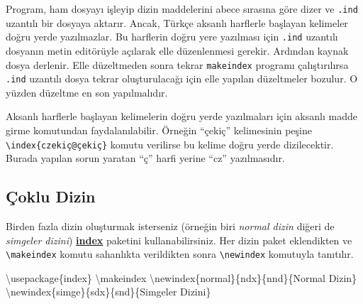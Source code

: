 \documentclass[
  letterpaper,
  DIV=11,
  numbers=noendperiod]{scrreprt}
\newenvironment{Shaded}{\begin{snugshade}}{\end{snugshade}}
\newcommand{\BuiltInTok}[1]{\textcolor[rgb]{0.00,0.23,0.31}{#1}}
\newcommand{\ExtensionTok}[1]{\textcolor[rgb]{0.00,0.23,0.31}{#1}}
\newcommand{\FunctionTok}[1]{\textcolor[rgb]{0.28,0.35,0.67}{#1}}
\newcommand{\NormalTok}[1]{\textcolor[rgb]{0.00,0.23,0.31}{#1}}
\begin{document}
Program, ham dosyayı işleyip dizin maddelerini abece sırasına göre dizer
ve \texttt{.ind} uzantılı bir dosyaya aktarır. Ancak, Türkçe aksanlı
harflerle başlayan kelimeler doğru yerde yazılmazlar. Bu harflerin doğru
yere yazılması için \texttt{.ind} uzantılı dosyanın metin editörüyle
açılarak elle düzenlenmesi gerekir. Ardından kaynak dosya derlenir. Elle
düzeltmeden sonra tekrar \texttt{makeindex} programı çalıştırılırsa
\texttt{.ind} uzantılı dosya tekrar oluşturulacağı için elle yapılan
düzeltmeler bozulur. O yüzden düzeltme en son yapılmalıdır.

\begin{tcolorbox}[enhanced jigsaw, opacitybacktitle=0.6, coltitle=black, leftrule=.75mm, rightrule=.15mm, toprule=.15mm, bottomtitle=1mm, titlerule=0mm, colbacktitle=quarto-callout-note-color!10!white, breakable, arc=.35mm, opacityback=0, colframe=quarto-callout-note-color-frame, toptitle=1mm, title=\textcolor{quarto-callout-note-color}{\faInfo}\hspace{0.5em}{Not}, bottomrule=.15mm, left=2mm, colback=white]
Aksanlı harflerle başlayan kelimelerin doğru yerde yazılmaları için
aksanlı madde girme komutundan faydalanılabilir. Örneğin ``çekiç''
kelimesinin peşine \texttt{\textbackslash{}index\{czekiç@çekiç\}} komutu
verilirse bu kelime doğru yerde dizilecektir. Burada yapılan sorun
yaratan ``ç'' harfi yerine ``cz'' yazılmasıdır.
\end{tcolorbox}

\hypertarget{uxe7oklu-dizin}{%
\subsection{Çoklu Dizin}\label{uxe7oklu-dizin}}

Birden fazla dizin oluşturmak isterseniz (örneğin biri \emph{normal
dizin} diğeri de \emph{simgeler dizini})
\href{http://ftp.cc.uoc.gr/mirrors/CTAN/macros/latex/contrib/index/index.pdf}{\textbf{index}}
paketini kullanabilirsiniz. Her dizin paket eklendikten ve
\texttt{\textbackslash{}makeindex} komutu sahanlıkta verildikten sonra
\texttt{\textbackslash{}newindex} komutuyla tanıtılır.

\begin{Shaded}
\begin{Highlighting}[]
\BuiltInTok{\textbackslash{}usepackage}\NormalTok{\{}\ExtensionTok{index}\NormalTok{\}}
\FunctionTok{\textbackslash{}makeindex}
\FunctionTok{\textbackslash{}newindex}\NormalTok{\{normal\}\{ndx\}\{nnd\}\{Normal Dizin\}}
\FunctionTok{\textbackslash{}newindex}\NormalTok{\{simge\}\{sdx\}\{snd\}\{Simgeler Dizini\}}
\end{Highlighting}
\end{Shaded}
\end{document}
